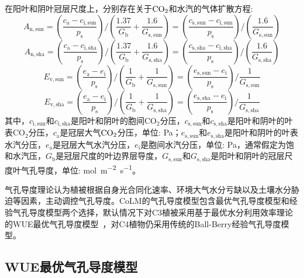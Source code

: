 在阳叶和阴叶冠层尺度上，分别存在关于$\rm CO_2$和水汽的气体扩散方程:
\begin{equation}\label{A_n2_sun}
A_{\mathrm{n,sun}}=\left(\frac{c_{\mathrm{a}}-c_{\mathrm{i,sun}}}{p_{\mathrm{s}}}\right) /\left(\frac{1.37}{G_{\mathrm{b}}} +\frac{1.6}{G_{\mathrm{s,sun}}}\right)=\left(\frac{c_{\mathrm{s,sun}}-c_{\mathrm{i,sun}}}{p_{\mathrm{s}}}\right) /\left(\frac{1.6}{G_{\mathrm{s,sun}}}\right)
\end{equation}
\begin{equation}\label{A_n2_sha}
A_{\mathrm{n,sha}}=\left(\frac{c_{\mathrm{a}}-c_{\mathrm{i,sha}}}{p_{\mathrm{s}}}\right) /\left(\frac{1.37}{G_{\mathrm{b}}} +\frac{1.6}{G_{\mathrm{s,sha}}}\right)=\left(\frac{c_{\mathrm{s,sha}}-c_{\mathrm{i,sha}}}{p_{\mathrm{s}}}\right) /\left(\frac{1.6}{G_{\mathrm{s,sha}}}\right)
\end{equation}
\begin{equation}\label{ea_ei_sun}
E_{\mathrm{v,sun}}=\left(\frac{e_{\mathrm{a}}-e_{\mathrm{i}}}{p_{\mathrm{s}}}\right) /\left(\frac{1}{G_{\mathrm{b}}}+\frac{1}{G_{\mathrm{s,sun}}}\right)=\left(\frac{e_{\mathrm{s,sun}}-e_{\mathrm{i}}}{p_{\mathrm{s}}}\right) / \frac{1}{G_{\mathrm{s,sun}}}
\end{equation}
\begin{equation}\label{ea_ei_sha}
E_{\mathrm{v,sha}}=\left(\frac{e_{\mathrm{a}}-e_{\mathrm{i}}}{p_{\mathrm{s}}}\right) /\left(\frac{1}{G_{\mathrm{b}}}+\frac{1}{G_{\mathrm{s,sha}}}\right)=\left(\frac{e_{\mathrm{s,sha}}-e_{\mathrm{i}}}{p_{\mathrm{s}}}\right) / \frac{1}{G_{\mathrm{s,sha}}}
\end{equation}
其中，$c_{\mathrm{i,sun}}$和$c_{\mathrm{i,sha}}$是阳叶和阴叶的胞间CO$_2$分压，$c_{\mathrm{s,sun}}$和$c_{\mathrm{s,sha}}$是阳叶和阴叶的叶表CO$_2$分压，$c_{\mathrm {a}}$是冠层大气$\rm CO_2$分压，单位: Pa；$e_{\mathrm{s,sun}}$和$e_{\mathrm{s,sha}}$是阳叶和阴叶的叶表水汽分压，$e_{\mathrm {a}}$是冠层大气水汽分压，$e_{\mathrm {i}}$是胞间水汽分压，单位: Pa，通常假定为饱和水汽压，$G_{\mathrm {b}}$是冠层尺度的叶边界层导度，$G_{\mathrm{s,sun}}$和$G_{\mathrm{s,sha}}$是阳叶和阴叶的冠层尺度叶气孔导度，单位: \unit{mol.m^{-2}.s^{-1}}。

气孔导度理论认为植被根据自身光合同化速率、环境大气水分亏缺以及土壤水分胁迫等因素，主动调控气孔导度。CoLM的气孔导度模型包含最优气孔导度模型和经验气孔导度模型两个选择，默认情况下对C3植被采用基于最优水分利用效率理论的WUE最优气孔导度模型~\citep{Liang2023}，对C4植物仍采用传统的Ball-Berry经验气孔导度模型。

\subsection{WUE最优气孔导度模型}

